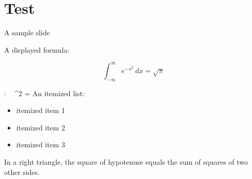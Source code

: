 \section{Test}

\begin{frame}{A sample slide}

A displayed formula:

\[
  \int_{-\infty}^\infty e^{-x^2} \, dx = \sqrt{\pi}
\]

\be
	\forall \alpha \in \C : ~ \abs{\alpha}^2 = 
\ee
An itemized list:

\begin{itemize}
	\item itemized item 1
	\item itemized item 2
	\item itemized item 3
\end{itemize}

\begin{theorem}
	In a right triangle, the square of hypotenuse equals
	the sum of squares of two other sides.
\end{theorem}


\end{frame}
